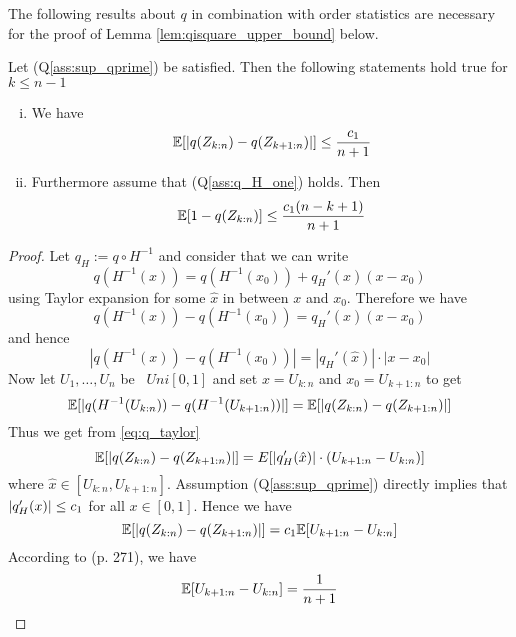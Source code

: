 %
The following results about $q$ in  combination with order statistics are necessary for the proof of Lemma \ref{lem:qisquare_upper_bound} below. 
\begin{lemma} \label{lem:q_spacings}
	Let (Q\ref{ass:sup_qprime}) be satisfied. Then the following statements hold true for $k\leq n-1$
	\begin{enumerate}[(i)]
		\item We have
		\begin{equation}
		\mathbb{E}[|q(Z_{k:n})-q(Z_{k+1:n})|] \leq \frac{c_1}{n+1}
		\label{eq:q_spacings_a}
		\end{equation}
		\item Furthermore assume that (Q\ref{ass:q_H_one}) holds. Then
		\begin{equation}
		\mathbb{E}[1-q(Z_{k:n})] \leq \frac{c_1(n-k+1)}{n+1}
		\label{eq:q_spacings_lastk}
		\end{equation}
	\end{enumerate}
	\begin{proof}
		Let $q_H := q\circ H^{-1}$ and consider that we can write
		\begin{equation}
		q(H^{-1}(x)) = q(H^{-1}(x_0)) + q_H'(\hat{x})(x-x_0)
		\label{eq:taylor_q}
		\end{equation}
		using Taylor expansion for some $\hat{x}$ in between $x$ and $x_0$. Therefore we have 
		$$q(H^{-1}(x)) - q(H^{-1}(x_0)) = q_H'(\hat{x})(x-x_0)$$
		and hence
		\begin{equation}
		|q(H^{-1}(x)) - q(H^{-1}(x_0))| = |q_H'(\hat{x})|\cdot |x-x_0|
		\label{eq:q_taylor}
		\end{equation}
		Now let $U_1, \dots,U_n$ be \iid\ $Uni[0,1]$ and set $x=U_{k:n}$ and $x_0=U_{k+1:n}$ to get
		\begin{equation*}
		\mathbb{E}[|q(H^{-1}(U_{k:n})) - q(H^{-1}(U_{k+1:n}))|] = \mathbb{E}[|q(Z_{k:n}) - q(Z_{k+1:n})|]
		\end{equation*}
		Thus we get from \eqref{eq:q_taylor}
		\begin{equation*}
		\mathbb{E}[|q(Z_{k:n}) - q(Z_{k+1:n})|] = E[|q_H'(\hat{x})|\cdot (U_{k+1:n} - U_{k:n})]
		\end{equation*}
		where $\hat{x} \in [U_{k:n}, U_{k+1:n}]$.
		Assumption (Q\ref{ass:sup_qprime}) directly implies that $\lvert q_H'(x)\rvert\leq c_1$ for all $x \in [0,1]$. Hence we have
		$$\mathbb{E}[|q(Z_{k:n}) - q(Z_{k+1:n})|] = c_1 \mathbb{E}[U_{k+1:n} - U_{k:n}]$$
		According to \cite{shorack2009empirical} (p. 271), we have
		\begin{equation}
		\E[U_{k+1:n} - U_{k:n}] = \frac{1}{n+1}

\end{equation}
\end{proof}
\end{lemma}
